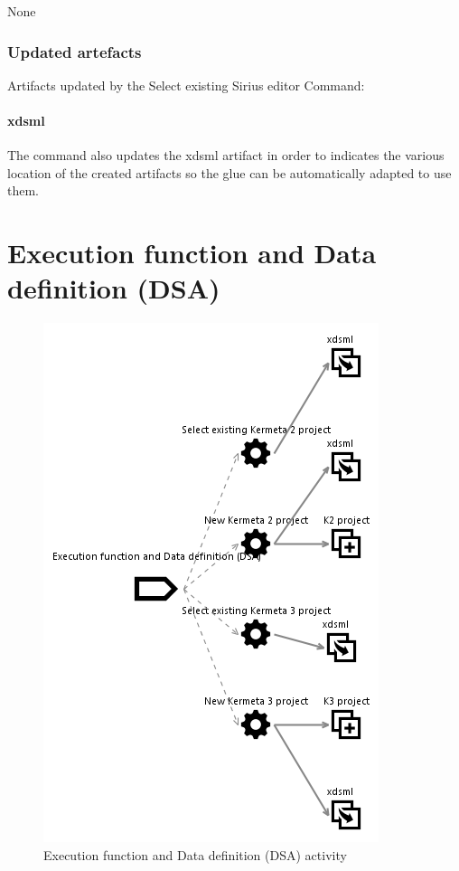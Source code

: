 \documentclass{gemoc} %
\begin{document}
	None
\subsubsection{Updated artefacts}
Artifacts updated by the Select existing Sirius editor Command:
\paragraph{xdsml} 
The command also updates the xdsml artifact in order to indicates the various location of the created artifacts so the glue can be automatically adapted to use them.

\section{Execution function and Data definition (DSA)}
\label{sec:Execution_function_and_Data_definition_(DSA)}
\begin{figure}[h]
		\center
		\includegraphics*[trim=0.0cm 0.0cm 0cm 0.0cm, clip=true]{fig/Execution_function_and_Data_definition_(DSA)}
		\caption{Execution function and Data definition (DSA) activity}
		\label{fig:Execution_function_and_Data_definition_(DSA)}
\end{figure}
\end{document}
